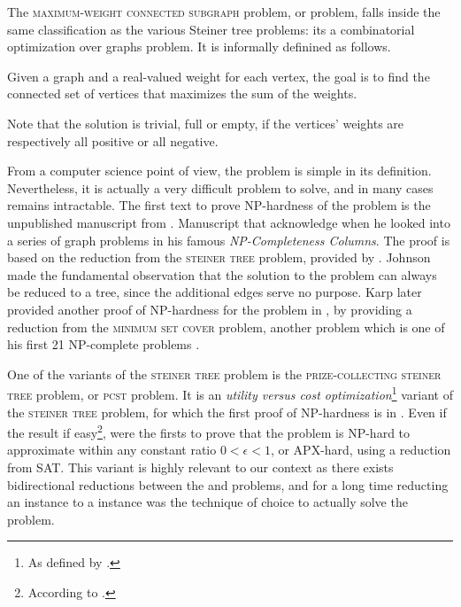 	The \textsc{maximum-weight connected subgraph} problem, or \mwcs{} problem, falls inside the same classification as the various Steiner tree problems: its a combinatorial optimization over graphs problem.
	It is informally definined as follows.

	Given a graph and a real-valued weight for each vertex, the goal is to find the connected set of vertices that maximizes the sum of the weights.

	Note that the solution is trivial, full or empty, if the vertices' weights are respectively all positive or all negative.

	From a computer science point of view, the \mwcs{} problem is simple in its definition.
	Nevertheless, it is actually a very difficult problem to solve, and in many cases remains intractable.
	The first text to prove NP-hardness of the problem is the unpublished manuscript from \textcite{vergis1983manuscript}.
	Manuscript that \textcite[Section 5]{johnson1985np} acknowledge when he looked into a series of graph problems in his famous \emph{NP-Completeness Columns}.
	The proof is based on the reduction from the \textsc{steiner tree} problem, provided by \textcite{garey1979computers}.
	Johnson made the fundamental observation that the solution to the \mwcs{} problem can always be reduced to a tree, since the additional edges serve no purpose.
	Karp later provided another proof of NP-hardness for the \mwcs{} problem in \parencite[Supplementary Material]{ideker2002discovering}, by providing a reduction from the \textsc{minimum set cover} problem, another problem which is one of his first 21 NP-complete problems \parencite{karp1972reducibility}.

	One of the variants of the \textsc{steiner tree} problem is the \textsc{prize-collecting steiner tree} problem, or \textsc{pcst} problem.
	It is an \emph{utility versus cost optimization}\footnote{As defined by \textcite{conrad2007connections}.} variant of the \textsc{steiner tree} problem, for which the first proof of NP-hardness is in \parencite{camerini1979complexity}.
	Even if the result if easy\footnote{According to \textcite[footnote 12]{feigenbaum2000sharing}.}, \textcite{feigenbaum2000sharing} were the firsts to prove that the \pcst{} problem is NP-hard to approximate within any constant ratio $0 < \epsilon < 1$, or APX-hard, using a reduction from SAT.
	This variant is highly relevant to our context as there exists bidirectional reductions between the \pcst{} and \mwcs{} problems, and for a long time reducting an \mwcs{} instance to a \pcst{} instance was the technique of choice to actually solve the problem.

